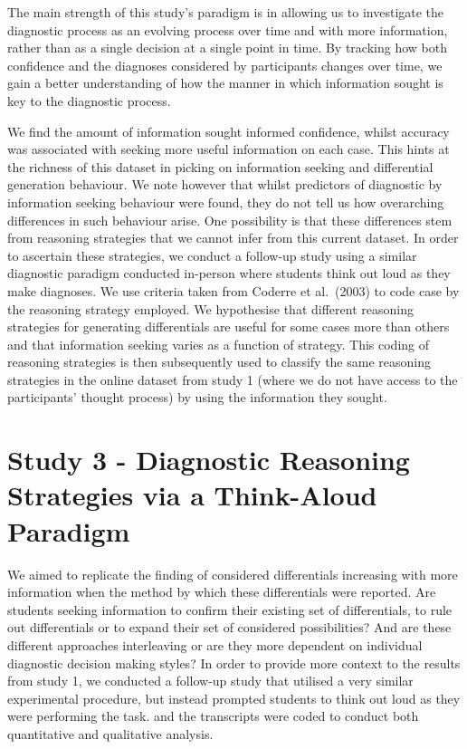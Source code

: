 \documentclass[a4paper, nobind]{templates/ociamthesis}
\begin{document}
The main strength of this study's paradigm is in allowing us to investigate the diagnostic process as an evolving process over time and with more information, rather than as a single decision at a single point in time. By tracking how both confidence and the diagnoses considered by participants changes over time, we gain a better understanding of how the manner in which information sought is key to the diagnostic process.

We find the amount of information sought informed confidence, whilst accuracy was associated with seeking more useful information on each case. This hints at the richness of this dataset in picking on information seeking and differential generation behaviour. We note however that whilst predictors of diagnostic by information seeking behaviour were found, they do not tell us how overarching differences in such behaviour arise. One possibility is that these differences stem from reasoning strategies that we cannot infer from this current dataset. In order to ascertain these strategies, we conduct a follow-up study using a similar diagnostic paradigm conducted in-person where students think out loud as they make diagnoses. We use criteria taken from Coderre et al.~(2003) to code case by the reasoning strategy employed. We hypothesise that different reasoning strategies for generating differentials are useful for some cases more than others and that information seeking varies as a function of strategy. This coding of reasoning strategies is then subsequently used to classify the same reasoning strategies in the online dataset from study 1 (where we do not have access to the participants' thought process) by using the information they sought.

\chapter*{Study 3 - Diagnostic Reasoning Strategies via a Think-Aloud Paradigm}\label{study-3---diagnostic-reasoning-strategies-via-a-think-aloud-paradigm}

\adjustmtc
{}

We aimed to replicate the finding of considered differentials increasing with more information when the method by which these differentials were reported. Are students seeking information to confirm their existing set of differentials, to rule out differentials or to expand their set of considered possibilities? And are these different approaches interleaving or are they more dependent on individual diagnostic decision making styles? In order to provide more context to the results from study 1, we conducted a follow-up study that utilised a very similar experimental procedure, but instead prompted students to think out loud as they were performing the task. and the transcripts were coded to conduct both quantitative and qualitative analysis.
\end{document}
